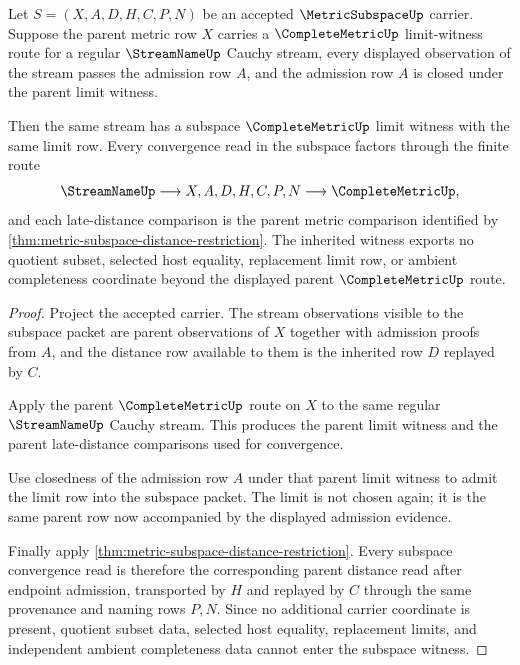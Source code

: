\begin{theorem}
\label{thm:metric-subspace-closed-complete-inheritance}
Let $S=(X,A,D,H,C,P,N)$ be an accepted $\MetricSubspaceUp$ carrier. Suppose the parent metric row $X$ carries a $\CompleteMetricUp$ limit-witness route for a regular $\StreamNameUp$ Cauchy stream, every displayed observation of the stream passes the admission row $A$, and the admission row $A$ is closed under the parent limit witness.

Then the same stream has a subspace $\CompleteMetricUp$ limit witness with the same limit row. Every convergence read in the subspace factors through the finite route
$$
\StreamNameUp \longrightarrow X,A,D,H,C,P,N
\longrightarrow \CompleteMetricUp ,
$$
and each late-distance comparison is the parent metric comparison identified by \autoref{thm:metric-subspace-distance-restriction}. The inherited witness exports no quotient subset, selected host equality, replacement limit row, or ambient completeness coordinate beyond the displayed parent $\CompleteMetricUp$ route.
\end{theorem}
\begin{proof}
Project the accepted carrier. The stream observations visible to the subspace packet are parent observations of $X$ together with admission proofs from $A$, and the distance row available to them is the inherited row $D$ replayed by $C$.

Apply the parent $\CompleteMetricUp$ route on $X$ to the same regular $\StreamNameUp$ Cauchy stream. This produces the parent limit witness and the parent late-distance comparisons used for convergence.

Use closedness of the admission row $A$ under that parent limit witness to admit the limit row into the subspace packet. The limit is not chosen again; it is the same parent row now accompanied by the displayed admission evidence.

Finally apply \autoref{thm:metric-subspace-distance-restriction}. Every subspace convergence read is therefore the corresponding parent distance read after endpoint admission, transported by $H$ and replayed by $C$ through the same provenance and naming rows $P,N$. Since no additional carrier coordinate is present, quotient subset data, selected host equality, replacement limits, and independent ambient completeness data cannot enter the subspace witness.
\end{proof}

